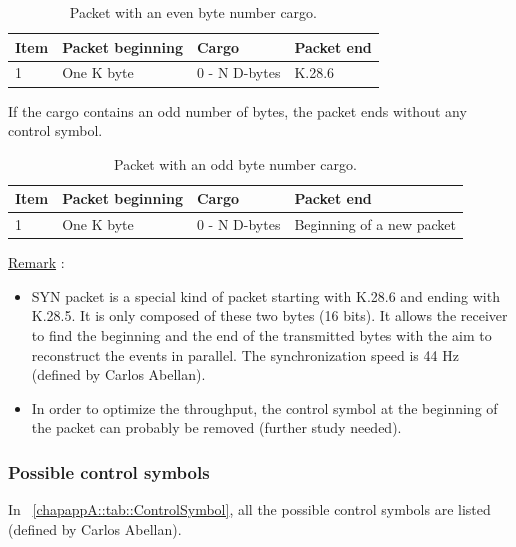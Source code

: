 \begin{table} [!htbp]
\centering
\caption{Packet with an even byte number cargo.}
\label{chapappA::tab::EvenCargo}
\begin{tabular}{m{1.5cm} M{2.5cm} M{2.5cm} M{4cm}}
\toprule
{}
\textbf{Item}  	&\textbf{Packet beginning}		&\textbf{Cargo} 	&\textbf{Packet end}\\
				& One K byte 					& 0 - N D-bytes		& K.28.6	\\
\bottomrule
\end{tabular}
\end{table}

If the cargo contains an odd number of bytes, the packet ends without any control symbol.

\begin{table} [!htbp]
\centering
\caption{Packet with an odd byte number cargo.}
\label{chapappA::tab::OddCargo}
\begin{tabular}{m{1.5cm} M{2.5cm} M{2.5cm} M{4cm}}
\toprule
{}
\textbf{Item}  	&\textbf{Packet beginning}		&\textbf{Cargo} 	&\textbf{Packet end}\\
				& One K byte						& 0 - N D-bytes		& Beginning of a new packet	\\
\bottomrule
\end{tabular}
\end{table}

\underline{Remark} :
	\begin{itemize}
		\item SYN packet is a special kind of packet starting with K.28.6 and ending with K.28.5. It is only composed of these two bytes (16 bits). It allows the receiver to find the beginning and the end of the transmitted bytes with the aim to reconstruct the events in parallel. The synchronization speed is 44 Hz (defined by Carlos Abellan).
		\item In order to optimize the throughput, the control symbol at the beginning of the packet can probably be removed (further study needed).
		\end{itemize}



\subsubsection{Possible control symbols}\label{chapappA::subsubsec::ctrlSymbols}
In \tablename~\ref{chapappA::tab::ControlSymbol}, all the possible control symbols are listed (defined by Carlos Abellan).

